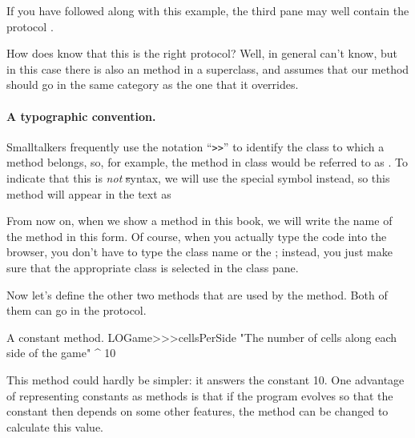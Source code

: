 \documentclass[a4paper,10pt,twoside]{book}
\begin{document}
If you have followed along with this example, the third pane may well contain the protocol .

How does \pharo{} know that this is the right protocol?  Well, in general \pharo{} can't know, but in this case there is also an  method in a superclass, and \pharo assumes that our  method should go in the same category as the one that it overrides.


\paragraph{A typographic convention.} Smalltalkers frequently use the notation ``\verb|>>|'' to identify the class to which a method belongs, so, for example, the  method in class  would be referred to as .
To indicate that this is \emph{not} \st syntax, we will use the special symbol \ct{>>>} instead, so this method will appear in the text as 

From now on, when we show a method in this book, we will write the name of the method in this form.  Of course, when you actually type the code into the browser, you don't have to type the class name or the \ct{>>>}; instead, you just make sure that the appropriate class is selected in the class pane.  

Now let's define the other two methods that are used by the  method. Both of them can go in the  protocol.

\begin{method}[sbegamecellsperside]{A constant method.}
LOGame>>>cellsPerSide
   "The number of cells along each side of the game"
   ^ 10
\end{method}

This method could hardly be simpler: it answers the constant 10.  One advantage of representing constants as methods is that if the program evolves so that the constant then depends on some other features, the method can be changed to calculate this value.
\end{document}
